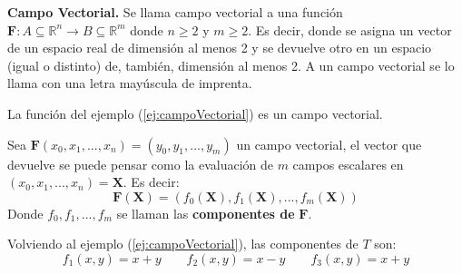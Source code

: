 \begin{definition}\textbf{Campo Vectorial.}
    Se llama campo vectorial a una función $\mathbf{F}:A\subseteq \mathbb{R}^n \rightarrow B \subseteq \mathbb{R}^m$
    donde $n\geq2$ y $m\geq2$. Es decir, donde se asigna un vector de un espacio real de dimensión al menos 2 y se devuelve otro
    en un espacio (igual o distinto) de, también, dimensión al menos 2. 
    A un campo vectorial se lo llama con una letra mayúscula de imprenta.
    
    La función del ejemplo (\ref{ej:campoVectorial}) es un campo vectorial.

    Sea $\mathbf{F}(x_0,x_1,...,x_n)=(y_0,y_1,...,y_m)$ un campo vectorial, el vector que devuelve
    se puede pensar como la evaluación de $m$ campos escalares en $(x_0,x_1,...,x_n)=\boldsymbol{X}$. 
    Es decir:
    \begin{equation*}
        \mathbf{F}(\boldsymbol{X})=(f_0(\boldsymbol{X}),f_1(\boldsymbol{X}),...,f_m(\boldsymbol{X}))
    \end{equation*}
    Donde $f_0,f_1,...,f_m$ se llaman las \textbf{componentes de} $\mathbf{F}$.

    Volviendo al ejemplo (\ref{ej:campoVectorial}), las componentes de $T$ son: 
    \begin{equation*}
        f_1(x,y)=x+y\qquad f_2(x,y)=x-y\qquad f_3(x,y)=x+y
    \end{equation*}
\end{definition}
